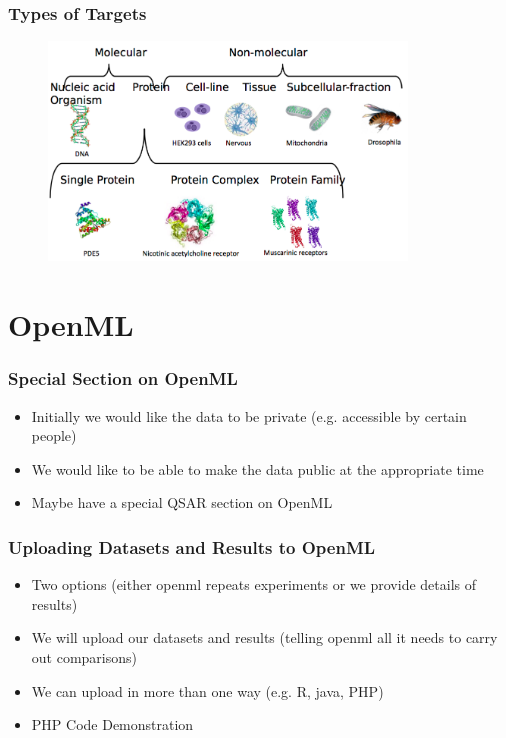 \documentclass[compress]{beamer}
\begin{document}
\begin{frame}
\frametitle{Types of Targets} 
\begin{figure}[h!]
  \centering
    \includegraphics[width=0.85\textwidth]{targets}
\end{figure}
\end{frame}
 







\section{OpenML}

\begin{frame}
\frametitle{Special Section on OpenML} 
\begin{itemize}%
 \item Initially we would like the data to be private (e.g. accessible by certain people)
 \item We would like to be able to make the data public at the appropriate time
 \item Maybe have a special QSAR section on OpenML
\end{itemize}
\end{frame}


\begin{frame}
\frametitle{Uploading Datasets and Results to OpenML} 
\begin{itemize}%
 \item Two options (either openml repeats experiments or we provide details of results)
 \item We will upload our datasets and results (telling openml all it needs to carry out comparisons)
 \item We can upload in more than one way (e.g. R, java, PHP)
 \item PHP Code Demonstration
\end{itemize}
\end{frame}
\end{document}

